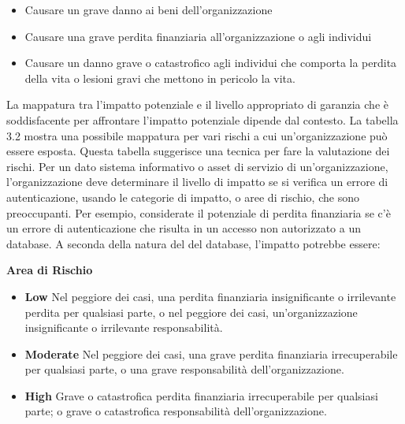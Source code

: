 \begin{itemize}
\begin{itemize}
        \item Causare un grave danno ai beni dell'organizzazione
        
        \item Causare una grave perdita finanziaria all'organizzazione o agli individui
        
        \item Causare un danno grave o catastrofico agli individui che comporta la perdita della vita o lesioni gravi che mettono in pericolo la vita.
    \end{itemize}

\end{itemize}

La mappatura tra l'impatto potenziale e il livello appropriato di garanzia che è soddisfacente per affrontare l'impatto potenziale dipende dal contesto. La tabella 3.2 mostra una possibile mappatura per vari rischi a cui un'organizzazione può essere esposta. Questa tabella suggerisce una tecnica per fare la valutazione dei rischi. Per un dato sistema informativo o asset di servizio di un'organizzazione, l'organizzazione deve determinare il livello di impatto se si verifica un errore di autenticazione, usando le categorie di impatto, o aree di rischio, che sono preoccupanti. Per esempio, considerate il potenziale di perdita finanziaria se c'è un errore di autenticazione che risulta in un accesso non autorizzato a un database. A seconda della natura del del database, l'impatto potrebbe essere:

\begin{center}
    \textbf{Area di Rischio}
\end{center}

\begin{itemize}
    \item \textbf{Low} Nel peggiore dei casi, una perdita finanziaria insignificante o irrilevante perdita per qualsiasi parte, o nel peggiore dei casi, un'organizzazione insignificante o irrilevante responsabilità.
    
    \item \textbf{Moderate} Nel peggiore dei casi, una grave perdita finanziaria irrecuperabile per qualsiasi parte, o una grave responsabilità dell'organizzazione.

    
    \item \textbf{High} Grave o catastrofica perdita finanziaria irrecuperabile per qualsiasi parte; o grave o catastrofica responsabilità dell'organizzazione.
\end{itemize}
\newpage
